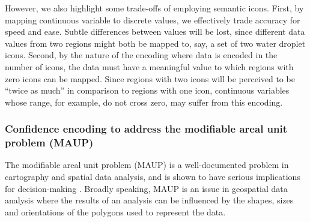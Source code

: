 


However, we also highlight some trade-offs of employing semantic icons.
%
First, by mapping continuous variable to discrete values, we effectively trade accuracy for speed and ease. 
%
Subtle differences between values will be lost, since different data values from two regions might both be mapped to, say, a set of two water droplet icons.
%
Second, by the nature of the encoding where data is encoded in the number of icons, the data must have a meaningful value to which regions with zero icons can be mapped.
%
Since regions with two icons will be perceived to be ``twice as much'' in comparison to regions with one icon, continuous variables whose range, for example, do not cross zero, may suffer from this encoding.


\subsubsection{Confidence encoding to address the modifiable areal unit problem (MAUP)}
\label{subsec:maup}
The modifiable areal unit problem (MAUP) is a well-documented problem in cartography and spatial data analysis, and is shown to have serious implications for decision-making \cite{fotheringham1991modifiable, manley2021scale, nelson_evaluating_2017}.
%
Broadly speaking, MAUP is an issue in geospatial data analysis where the results of an analysis can be influenced by the shapes, sizes and orientations of the polygons used to represent the data.

